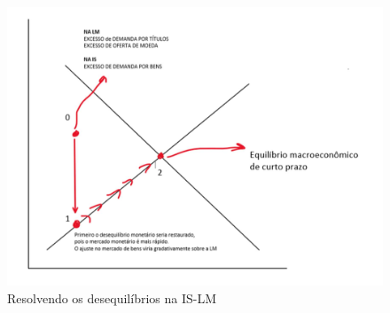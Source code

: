 \documentclass[a4paper,12pt]{article}[abntex2]
\begin{document}
\begin{figure}[H]
    \centering
    \caption{Resolvendo os desequilíbrios na IS-LM}
    \includegraphics[width=0.7\linewidth]{Imagens/a4i2.png}
\end{figure}
\end{document}

